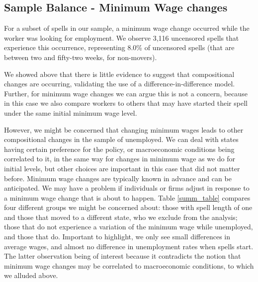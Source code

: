 \documentclass{article}
\begin{document}
\subsection{Sample Balance - Minimum Wage changes}

For a subset of spells in our sample, a minimum wage change occurred while the worker was looking for employment. We observe 3,116 uncensored spells that experience this occurrence, representing 8.0\% of uncensored spells (that are between two and fifty-two weeks, for non-movers).

We showed above that there is little evidence to suggest that compositional changes are occurring, validating the use of a difference-in-difference model. Further, for minimum wage changes we can argue this is not a concern, because in this case we also compare workers to others that may have started their spell under the same initial minimum wage level.

However, we might be concerned that changing minimum wages leads to other compositional changes in the sample of unemployed. We can deal with states having certain preference for the policy, or macroeconomic conditions being correlated to it, in the same way for changes in minimum wage as we do for initial levels, but other choices are important in this case that did not matter before. Minimum wage changes are typically known in advance and can be anticipated. We may have a problem if individuals or firms adjust in response to a minimum wage change that is about to happen. Table \ref{summ_table} compares four different groups we might be concerned about: those with spell length of one and those that moved to a different state, who we exclude from the analysis; those that do not experience a variation of the minimum wage while unemployed, and those that do. Important to highlight, we only see small differences in average wages, and almost no difference in unemployment rates when spells start. The latter observation being of interest because it contradicts the notion that minimum wage changes may be correlated to macroeconomic conditions, to which we alluded above.
\end{document}

